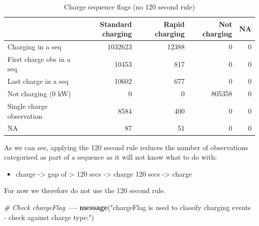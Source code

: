 \documentclass[]{article}
\newenvironment{Shaded}{\begin{snugshade}}{\end{snugshade}}
\newcommand{\CommentTok}[1]{\textcolor[rgb]{0.56,0.35,0.01}{\textit{#1}}}
\newcommand{\DataTypeTok}[1]{\textcolor[rgb]{0.13,0.29,0.53}{#1}}
\newcommand{\KeywordTok}[1]{\textcolor[rgb]{0.13,0.29,0.53}{\textbf{#1}}}
\newcommand{\NormalTok}[1]{#1}
\newcommand{\OperatorTok}[1]{\textcolor[rgb]{0.81,0.36,0.00}{\textbf{#1}}}
\newcommand{\StringTok}[1]{\textcolor[rgb]{0.31,0.60,0.02}{#1}}
\providecommand{\tightlist}{%
  \setlength{\itemsep}{0pt}\setlength{\parskip}{0pt}}
\begin{document}
\begin{Shaded}
\end{Shaded}

\begin{table}[t]

\caption{\label{tab:checkChargeFlagMethods}Charge sequence flags (no 120 second rule)}
\centering
\begin{tabular}{l|r|r|r|r}
\hline
  & Standard charging & Rapid charging & Not charging & NA\\
\hline
Charging in a seq & 1032623 & 12388 & 0 & 0\\
\hline
First charge obs in a seq & 10453 & 817 & 0 & 0\\
\hline
Last charge in a seq & 10602 & 677 & 0 & 0\\
\hline
Not charging (0 kW) & 0 & 0 & 805358 & 0\\
\hline
Single charge observation & 8584 & 400 & 0 & 0\\
\hline
NA & 87 & 51 & 0 & 0\\
\hline
\end{tabular}
\end{table}

As we can see, applying the 120 second rule reduces the number of observations categorised as part of a sequence as it will not know what to do with:

\begin{itemize}
\tightlist
\item
  charge -\textgreater{} gap of \textgreater{} 120 secs -\textgreater{} charge 120 secs -\textgreater{} charge
\end{itemize}

For now we therefore do not use the 120 second rule.

\begin{Shaded}
\begin{Highlighting}[]
\CommentTok{# Check chargeFlag ----}
\KeywordTok{message}\NormalTok{(}\StringTok{"chargeFlag is used to classify charging events - check against charge type:"}\NormalTok{)}
\end{Highlighting}
\end{Shaded}
\end{document}
